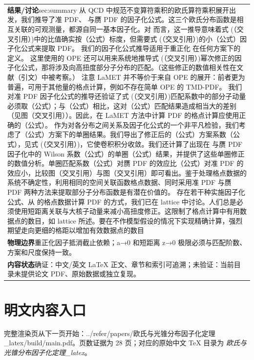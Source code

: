 \documentclass[UTF8,11pt,oneside]{ctexbook}
\begin{document}
\begin{table}[htbp]
\begin{tabular}{@{}p{}@{}}
    \textbf{结果/讨论}\quad sec:summary 从 QCD 中规范不变算符乘积的欧氏算符乘积展开出发，我们推导了准 PDF、 与赝 PDF 的因子化公式。这三个欧氏分布函数是相互关联的可观测量，都源自同一基本因子化。对 而言，这一推导意味着式 (（交叉引用）)中的比值确实按（公式）标度，但需要式 (（交叉引用）)的小（公式）因子化公式来提取 PDF。 我们的因子化公式推导适用于重正化 在任何方案下的定义。 这里使用的 OPE 还可以用来系统地推导式 (（交叉引用）)幂次修正的因子化公式，那将涉及向高扭度部分子分布的匹配。（这些修正的数值相关性在文献（引文）中被考察。） 注意 LaMET 并不等价于来自 OPE 的展开：前者更为普遍，可用于其他量的格点计算，例如不存在简单 OPE 的 TMD-PDF。 我们对准 PDF 因子化公式的推导还验证了式 (（交叉引用）)匹配系数中的部分子动量必须取（公式）；与（公式）相比，这对（公式）匹配结果造成相当大的差别（见图（交叉引用））。因此，在 LaMET 方法中计算 PDF 的格点计算应使用正确的（公式）。 作为对各分布之间关系及因子化公式的一个非平凡检验，我们考虑了（公式）方案下的单圈结果。我们导出了修正后的（公式）方案系数（公式），见式 (（交叉引用）)，它使卷积积分收敛。我们还计算了出现在 与赝 PDF 因子化中的 Wilson 系数（公式）的单圈（公式）结果，并提供了这些单圈修正的数值分析。单圈匹配系数（公式）对赝 PDF 的效应比（公式）对准 PDF 的效应小，比较图（交叉引用）与图（交叉引用）即可看出。鉴于处理格点数据的系统不确定性，利用相同的空间关联函数格点数据、同时采用准 PDF 与赝 PDF 两种方法来提取部分子分布函数是有潜在价值的。 存在若干种实施因子化公式、从 的格点数据计算 PDF 的方式，我们已在 lattice 中讨论。人们总是必须使用短距离关联与大核子动量来减小高扭度修正。这限制了格点计算中有用数据点的数目，如 lattice 所述。要在不作模型假设的情况下实现精确计算，强烈期望走向更细的格距以增加有效数据点的数目 \\
    \textbf{物理边界}\quad 重正化因子抵消截止依赖；a→0 和短距离 z→0 极限必须与匹配阶数、方案和尺度保持一致。 \\
    \textbf{内容状态}\quad 确证：中文/英文 LaTeX 正文、章节和索引可追溯；未验证：当前目录未提供论文 PDF、原始数据或独立复现。 \\
    \bottomrule
  \end{tabular}
\end{table}
\section*{明文内容入口}
\noindent 完整渲染页从下一页开始：../\allowbreak{}refer/\allowbreak{}papers/\allowbreak{}欧氏与光锥分布因子化定理\_\allowbreak{}latex/\allowbreak{}build/\allowbreak{}main.pdf。页数证据为 28 页；对应的原始中文 TeX 目录为 \emph{欧氏与光锥分布因子化定理\_latex}。
\clearpage

\clearpage
\end{document}
